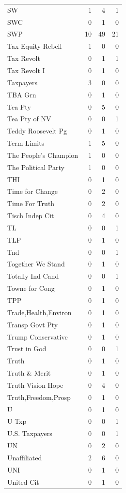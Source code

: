 \begin{supertabular}{lrrr}
SW & 1 & 4 & 1\\
SWC & 0 & 1 & 0\\
SWP & 10 & 49 & 21\\
Tax Equity Rebell & 1 & 0 & 0\\
Tax Revolt & 0 & 1 & 1\\
Tax Revolt I & 0 & 1 & 0\\
Taxpayers & 3 & 0 & 0\\
TBA Grn & 0 & 1 & 0\\
Tea Pty & 0 & 5 & 0\\
Tea Pty of NV & 0 & 0 & 1\\
Teddy Roosevelt Pg & 0 & 1 & 0\\
Term Limits & 1 & 5 & 0\\
The People's Champion & 1 & 0 & 0\\
The Political Party & 1 & 0 & 0\\
THI & 0 & 1 & 0\\
Time for Change & 0 & 2 & 0\\
Time For Truth & 0 & 2 & 0\\
Tisch Indep Cit & 0 & 4 & 0\\
TL & 0 & 0 & 1\\
TLP & 0 & 1 & 0\\
Tnd & 0 & 0 & 1\\
Together We Stand & 0 & 1 & 0\\
Totally Ind Cand & 0 & 0 & 1\\
Towne for Cong & 0 & 1 & 0\\
TPP & 0 & 1 & 0\\
Trade,Health,Environ & 0 & 1 & 0\\
Transp Govt Pty & 0 & 1 & 0\\
Trump Conservative & 0 & 1 & 0\\
Trust in God & 0 & 0 & 1\\
Truth & 0 & 1 & 0\\
Truth \& Merit & 0 & 1 & 0\\
Truth Vision Hope & 0 & 4 & 0\\
Truth,Freedom,Prosp & 0 & 1 & 0\\
U & 0 & 1 & 0\\
U Txp & 0 & 0 & 1\\
U.S. Taxpayers & 0 & 0 & 1\\
UN & 0 & 2 & 0\\
Unaffiliated & 2 & 6 & 0\\
UNI & 0 & 1 & 0\\
United Cit & 0 & 1 & 0\\

\end{supertabular}
